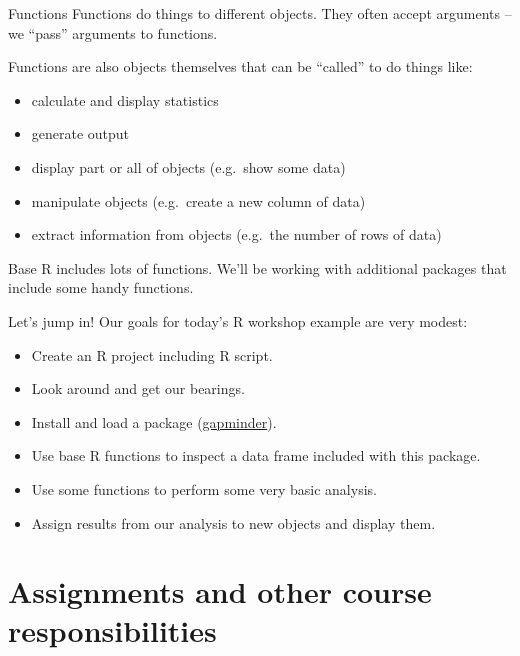 \documentclass[
  8pt,
  ignorenonframetext,
  dvipsnames]{beamer}
\providecommand{\tightlist}{%
  \setlength{\itemsep}{0pt}\setlength{\parskip}{0pt}}
\let\olditem\item
\renewcommand{\item}{%
  \olditem\vspace{4pt}
}
\begin{document}
\begin{frame}{Functions}
\protect\hypertarget{functions}{}
Functions do things to different objects. They often accept arguments --
we ``pass'' arguments to functions.

Functions are also objects themselves that can be ``called'' to do
things like:

\begin{itemize}
\tightlist
\item
  calculate and display statistics
\item
  generate output
\item
  display part or all of objects (e.g.~show some data)
\item
  manipulate objects (e.g.~create a new column of data)
\item
  extract information from objects (e.g.~the number of rows of data)
\end{itemize}

Base R includes lots of functions. We'll be working with additional
packages that include some handy functions.
\end{frame}

\begin{frame}{Let's jump in!}
\protect\hypertarget{lets-jump-in}{}
Our goals for today's R workshop example are very modest:

\begin{itemize}
\tightlist
\item
  Create an R project including R script.
\item
  Look around and get our bearings.
\item
  Install and load a package
  (\href{https://www.gapminder.org/}{gapminder}).
\item
  Use base R functions to inspect a data frame included with this
  package.
\item
  Use some functions to perform some very basic analysis.
\item
  Assign results from our analysis to new objects and display them.
\end{itemize}
\end{frame}

\hypertarget{assignments-and-other-course-responsibilities}{%
\section{Assignments and other course
responsibilities}\label{assignments-and-other-course-responsibilities}}
\end{document}
